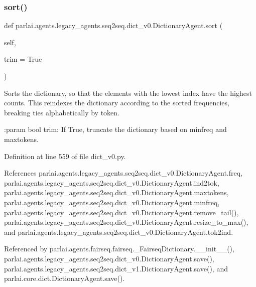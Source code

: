 \subsubsection{\texorpdfstring{sort()}{sort()}}
{\footnotesize\ttfamily def parlai.\+agents.\+legacy\+\_\+agents.\+seq2seq.\+dict\+\_\+v0.\+Dictionary\+Agent.\+sort (\begin{DoxyParamCaption}\item[{}]{self,  }\item[{}]{trim = {\ttfamily True} }\end{DoxyParamCaption})}

\begin{DoxyVerb}Sorts the dictionary, so that the elements with the lowest index have
the highest counts. This reindexes the dictionary according to the
sorted frequencies, breaking ties alphabetically by token.

:param bool trim: If True, truncate the dictionary based on minfreq and
    maxtokens.
\end{DoxyVerb}
 

Definition at line 559 of file dict\+\_\+v0.\+py.



References parlai.\+agents.\+legacy\+\_\+agents.\+seq2seq.\+dict\+\_\+v0.\+Dictionary\+Agent.\+freq, parlai.\+agents.\+legacy\+\_\+agents.\+seq2seq.\+dict\+\_\+v0.\+Dictionary\+Agent.\+ind2tok, parlai.\+agents.\+legacy\+\_\+agents.\+seq2seq.\+dict\+\_\+v0.\+Dictionary\+Agent.\+maxtokens, parlai.\+agents.\+legacy\+\_\+agents.\+seq2seq.\+dict\+\_\+v0.\+Dictionary\+Agent.\+minfreq, parlai.\+agents.\+legacy\+\_\+agents.\+seq2seq.\+dict\+\_\+v0.\+Dictionary\+Agent.\+remove\+\_\+tail(), parlai.\+agents.\+legacy\+\_\+agents.\+seq2seq.\+dict\+\_\+v0.\+Dictionary\+Agent.\+resize\+\_\+to\+\_\+max(), and parlai.\+agents.\+legacy\+\_\+agents.\+seq2seq.\+dict\+\_\+v0.\+Dictionary\+Agent.\+tok2ind.



Referenced by parlai.\+agents.\+fairseq.\+fairseq.\+\_\+\+Fairseq\+Dictionary.\+\_\+\+\_\+init\+\_\+\+\_\+(), parlai.\+agents.\+legacy\+\_\+agents.\+seq2seq.\+dict\+\_\+v0.\+Dictionary\+Agent.\+save(), parlai.\+agents.\+legacy\+\_\+agents.\+seq2seq.\+dict\+\_\+v1.\+Dictionary\+Agent.\+save(), and parlai.\+core.\+dict.\+Dictionary\+Agent.\+save().

